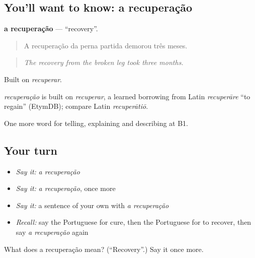 \subsection*{You'll want to know: a recuperação}
\textbf{a recuperação} — \textquotedblleft{}recovery\textquotedblright{}.

\begin{quote}
A recuperação da perna partida demorou três meses.
\end{quote}

\begin{quote}
\emph{The recovery from the broken leg took three months.}
\end{quote}

Built on \emph{recuperar}.

\begin{cousinweb}
\emph{recuperação} is built on \emph{recuperar}, a learned borrowing from Latin \emph{recuperāre} \textquotedblleft{}to regain\textquotedblright{} (EtymDB); compare Latin \emph{recuperātiō}.
\end{cousinweb}

\begin{grammarlens}[title={What you've built}]
One more word for telling, explaining and describing at B1.
\end{grammarlens}

\subsection*{Your turn}
\begin{itemize}
\raggedright
  \item \emph{Say it:} \emph{a recuperação}
  \item \emph{Say it:} \emph{a recuperação}, once more
  \item \emph{Say it:} a sentence of your own with \emph{a recuperação}
  \item \emph{Recall:} say the Portuguese for cure, then the Portuguese for to recover, then say \emph{a recuperação} again
\end{itemize}

\begin{tcolorbox}[breakable,colback=teal!4,colframe=teal!35!black,title={Before you move on}]
What does a recuperação mean? (\textquotedblleft{}Recovery\textquotedblright{}.) Say it once more.
\end{tcolorbox}
